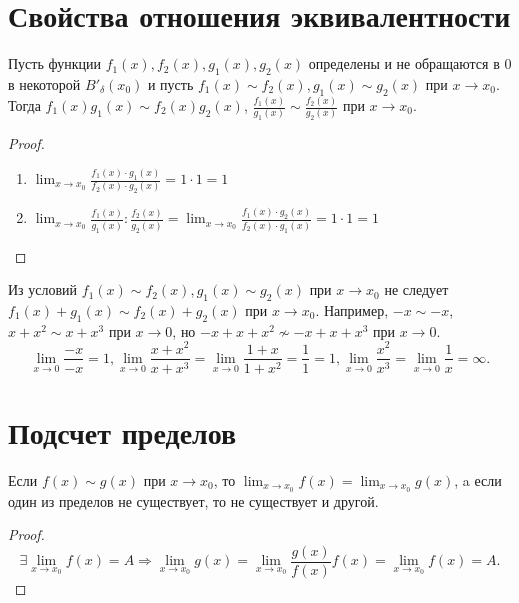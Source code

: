 	\section{Свойства отношения эквивалентности}
	
	\begin{lemma}
		Пусть функции $f_1(x), f_2(x), g_1(x), g_2(x)$ определены и не обращаются в $0$ в некоторой $B'_{\delta}(x_0)$ и пусть $f_1(x) \sim f_2(x), g_1(x) \sim g_2(x)$ при $x \to x_0$. Тогда $f_1(x)g_1(x) \sim f_2(x)g_2(x)$, $\frac{f_1(x)}{g_1(x)} \sim \frac{f_2(x)}{g_2(x)}$ при $x \to x_0$.
	\end{lemma}
	
	\begin{proof}
		\begin{enumerate}
			\item $\lim_{x \to x_0} \frac{f_1(x) \cdot g_1(x)}{f_2(x) \cdot g_2(x)} = 1 \cdot 1 = 1$
			\item $\lim_{x \to x_0} \frac{f_1(x)}{g_1(x)} : \frac{f_2(x)}{g_2(x)} = \lim_{x \to x_0} \frac{f_1(x) \cdot g_2(x)}{f_2(x) \cdot g_1(x)} = 1 \cdot 1 = 1$
		\end{enumerate}
	\end{proof}
	
	\begin{mention}
		Из условий $f_1(x) \sim f_2(x), g_1(x) \sim g_2(x)$ при $x \to x_0$ не следует $f_1(x) + g_1(x) \sim f_2(x) + g_2(x)$ при $x \to x_0$. Например, $-x \sim -x$, $x + x^2 \sim x + x^3$ при $x \to 0$, но $-x + x + x^2 \not\sim -x + x + x^3$ при $x \to 0$.
		\[ \lim_{x \to 0} \frac{-x}{-x} = 1, \lim_{x \to 0} \frac{x + x^2}{x + x^3} = \lim_{x \to 0} \frac{1 + x}{1 + x^2} = \frac{1}{1} = 1, \lim_{x \to 0} \frac{x^2}{x^3} = \lim_{x \to 0} \frac{1}{x} = \infty. \]
	\end{mention}
	
	\section{Подсчет пределов}
	
	\begin{lemma}
		Если $f(x) \sim g(x)$ при $x \to x_0$, то $\lim_{x \to x_0} f(x) = \lim_{x \to x_0} g(x)$, a если один из пределов не существует, то не существует и другой.
	\end{lemma}
	
	\begin{proof}
		\[ \exists \lim_{x \to x_0} f(x) = A \Rightarrow \lim_{x \to x_0} g(x) = \lim_{x \to x_0} \frac{g(x)}{f(x)} f(x) = \lim_{x \to x_0} f(x) = A. \]
	\end{proof}
	
